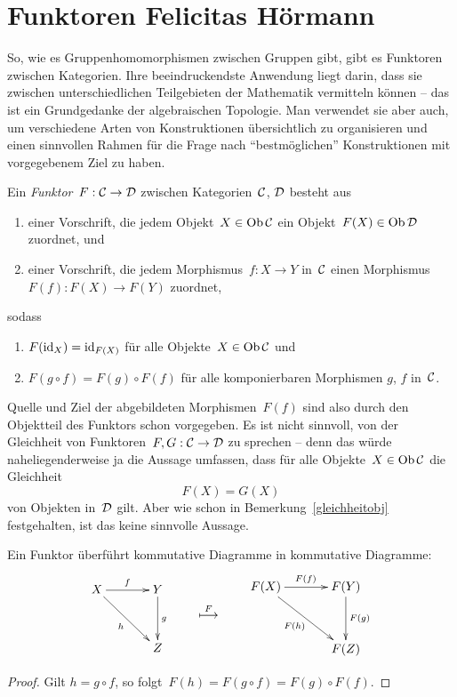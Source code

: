\section[Funktoren]{Funktoren \hfill \small Felicitas Hörmann}

So, wie es Gruppenhomomorphismen zwischen Gruppen gibt, gibt es Funktoren
zwischen Kategorien. Ihre beeindruckendste Anwendung liegt darin, dass sie
zwischen unterschiedlichen Teilgebieten der Mathematik vermitteln können -- das
ist ein Grundgedanke der algebraischen Topologie. Man verwendet sie aber auch,
um verschiedene Arten von Konstruktionen übersichtlich zu organisieren und
einen sinnvollen Rahmen für die Frage nach "`bestmöglichen"' Konstruktionen mit
vorgegebenem Ziel zu haben.

\begin{defn}Ein \emph{Funktor}~$F : \mathcal{C} \to \mathcal{D}$ zwischen Kategorien~$\mathcal{C}$, $\mathcal{D}$
besteht aus
\begin{enumerate}
\item einer Vorschrift, die jedem Objekt~$X \in \operatorname{Ob} \mathcal{C}$ ein Objekt~$F(X) \in \operatorname{Ob} \mathcal{D}$
zuordnet, und
\item einer Vorschrift, die jedem Morphismus~$f:X \to Y$ in~$\mathcal{C}$ einen
Morphismus~$F(f) : F(X) \to F(Y)$ zuordnet,
\end{enumerate}
sodass
\begin{enumerate}
\item $F(\mathrm{id}_X) = \mathrm{id}_{F(X)}$ für alle Objekte~$X \in \operatorname{Ob} \mathcal{C}$ und
\item $F(g \circ f) = F(g) \circ F(f)$ für alle komponierbaren Morphismen $g$, $f$
in~$\mathcal{C}$.
\end{enumerate}
\end{defn}
\begin{bem}\label{gleichheitfunktoren}%
Quelle und Ziel der abgebildeten Morphismen~$F(f)$ sind also durch
den Objektteil des Funktors schon vorgegeben. Es ist nicht sinnvoll, von der
Gleichheit von Funktoren~$F,G : \mathcal{C} \to \mathcal{D}$ zu sprechen -- denn das würde
naheliegenderweise ja die Aussage umfassen, dass für alle Objekte~$X \in \operatorname{Ob} \mathcal{C}$ die
Gleichheit
\[ F(X) = G(X) \]
von Objekten in~$\mathcal{D}$ gilt. Aber wie schon in Bemerkung~\ref{gleichheitobj}
festgehalten, ist das keine sinnvolle Aussage.
\end{bem}

\begin{prop}
Ein Funktor überführt kommutative Diagramme in kommutative Diagramme:
\[ \vcenter{ \xymatrix@=8ex{
  X \ar[r]^{f} \ar[rd]_{h} & Y \ar[d]^{g} \\
  & Z
} }
\qquad \overset{F}{\longmapsto} \qquad
\vcenter{ \xymatrix@=8ex{
  F(X) \ar[r]^{F(f)} \ar[rd]_{F(h)} & F(Y) \ar[d]^{F(g)} \\
  & F(Z)
} } \]
\end{prop}
\begin{proof}
Gilt $h = g \circ f$, so folgt~$F(h) = F(g \circ f) = F(g) \circ F(f)$.
\end{proof}


